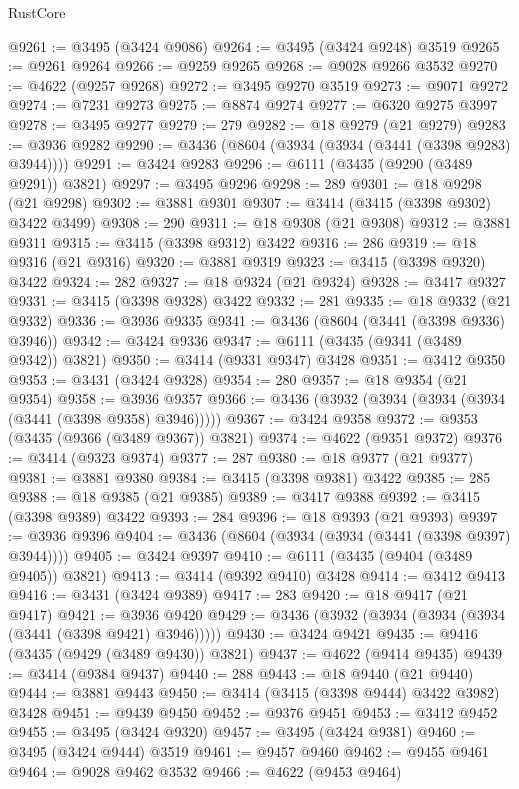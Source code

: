 \begin{lexlean}{RustCore}
\begin{coremodule}
@9261 := @3495 (@3424 @9086)
@9264 := @3495 (@3424 @9248) @3519
@9265 := @9261 @9264
@9266 := @9259 @9265
@9268 := @9028 @9266 @3532
@9270 := @4622 (@9257 @9268)
@9272 := @3495 @9270 @3519
@9273 := @9071 @9272
@9274 := @7231 @9273
@9275 := @8874 @9274
@9277 := @6320 @9275 @3997
@9278 := @3495 @9277
@9279 := 279
@9282 := @18 @9279 (@21 @9279)
@9283 := @3936 @9282
@9290 := @3436 (@8604 (@3934 (@3934 (@3441 (@3398 @9283) @3944))))
@9291 := @3424 @9283
@9296 := @6111 (@3435 (@9290 (@3489 @9291)) @3821)
@9297 := @3495 @9296
@9298 := 289
@9301 := @18 @9298 (@21 @9298)
@9302 := @3881 @9301
@9307 := @3414 (@3415 (@3398 @9302) @3422 @3499)
@9308 := 290
@9311 := @18 @9308 (@21 @9308)
@9312 := @3881 @9311
@9315 := @3415 (@3398 @9312) @3422
@9316 := 286
@9319 := @18 @9316 (@21 @9316)
@9320 := @3881 @9319
@9323 := @3415 (@3398 @9320) @3422
@9324 := 282
@9327 := @18 @9324 (@21 @9324)
@9328 := @3417 @9327
@9331 := @3415 (@3398 @9328) @3422
@9332 := 281
@9335 := @18 @9332 (@21 @9332)
@9336 := @3936 @9335
@9341 := @3436 (@8604 (@3441 (@3398 @9336) @3946))
@9342 := @3424 @9336
@9347 := @6111 (@3435 (@9341 (@3489 @9342)) @3821)
@9350 := @3414 (@9331 @9347) @3428
@9351 := @3412 @9350
@9353 := @3431 (@3424 @9328)
@9354 := 280
@9357 := @18 @9354 (@21 @9354)
@9358 := @3936 @9357
@9366 := @3436 (@3932 (@3934 (@3934 (@3934 (@3441 (@3398 @9358) @3946)))))
@9367 := @3424 @9358
@9372 := @9353 (@3435 (@9366 (@3489 @9367)) @3821)
@9374 := @4622 (@9351 @9372)
@9376 := @3414 (@9323 @9374)
@9377 := 287
@9380 := @18 @9377 (@21 @9377)
@9381 := @3881 @9380
@9384 := @3415 (@3398 @9381) @3422
@9385 := 285
@9388 := @18 @9385 (@21 @9385)
@9389 := @3417 @9388
@9392 := @3415 (@3398 @9389) @3422
@9393 := 284
@9396 := @18 @9393 (@21 @9393)
@9397 := @3936 @9396
@9404 := @3436 (@8604 (@3934 (@3934 (@3441 (@3398 @9397) @3944))))
@9405 := @3424 @9397
@9410 := @6111 (@3435 (@9404 (@3489 @9405)) @3821)
@9413 := @3414 (@9392 @9410) @3428
@9414 := @3412 @9413
@9416 := @3431 (@3424 @9389)
@9417 := 283
@9420 := @18 @9417 (@21 @9417)
@9421 := @3936 @9420
@9429 := @3436 (@3932 (@3934 (@3934 (@3934 (@3441 (@3398 @9421) @3946)))))
@9430 := @3424 @9421
@9435 := @9416 (@3435 (@9429 (@3489 @9430)) @3821)
@9437 := @4622 (@9414 @9435)
@9439 := @3414 (@9384 @9437)
@9440 := 288
@9443 := @18 @9440 (@21 @9440)
@9444 := @3881 @9443
@9450 := @3414 (@3415 (@3398 @9444) @3422 @3982) @3428
@9451 := @9439 @9450
@9452 := @9376 @9451
@9453 := @3412 @9452
@9455 := @3495 (@3424 @9320)
@9457 := @3495 (@3424 @9381)
@9460 := @3495 (@3424 @9444) @3519
@9461 := @9457 @9460
@9462 := @9455 @9461
@9464 := @9028 @9462 @3532
@9466 := @4622 (@9453 @9464)

\end{coremodule}
\end{lexlean}
